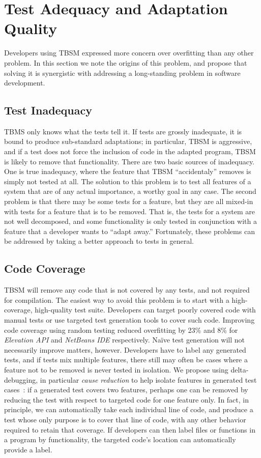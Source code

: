 \section{Test Adequacy and Adaptation Quality}
Developers using TBSM expressed more concern over overfitting than any other problem.  In this section we note the origins of this problem, and propose that solving it is synergistic with addressing a long-standing problem in software development.

\subsection{Test Inadequacy}

TBMS only knows what the tests tell it.  If tests are grossly inadequate, it is bound to produce sub-standard adaptations; in particular, TBSM is aggressive, and if a test does not force the inclusion of code in the adapted program, TBSM is likely to remove that functionality.  There are two basic sources of inadequacy.  One is true inadequacy, where the feature that TBSM ``accidentaly'' removes is simply not tested at all.  The solution to this problem is to test all features of a system that are of any actual importance, a worthy goal in any case.  The second problem is that there may be some tests for a feature, but they are all mixed-in with tests for a feature that is to be removed.  That is, the tests for a system are not well decomposed, and some functionality is only tested in conjunction with a feature that a developer wants to ``adapt away.''  Fortunately, these problems can be addressed by taking a better approach to tests in general.

\subsection{Code Coverage} 
TBSM will remove any code that is not covered by any tests, and not required for compilation. The easiest way to avoid this problem is to start with a high-coverage, high-quality test suite. Developers can target poorly covered code with manual tests or use targeted test generation tools to cover such code. Improving code coverage using random testing reduced overfitting by 23\% and 8\% for \textit{Elevation API} and \textit{NetBeans IDE} respectively. Na\"ive test generation will not necessarily improve matters, however. Developers have to label any generated tests, and if tests mix multiple features, there still may often be cases where a feature not to be removed is never tested in isolation. We propose using delta-debugging, in particular \emph{cause reduction} to help isolate features in generated test cases~\cite{stvrcausereduce}: if a generated test covers two features, perhaps one can be removed by reducing the test with respect to targeted code for one feature only.  In fact, in principle, we can automatically take each individual line of code, and produce a test whose only purpose is to cover that line of code, with any other behavior required to retain that coverage.  If developers can then label files or functions in a program by functionality, the targeted code's location can automatically provide a label.

